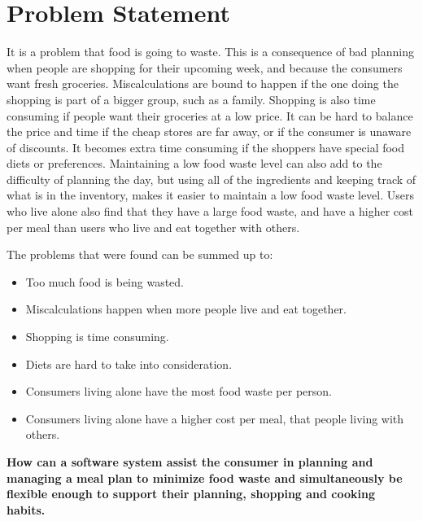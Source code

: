 \chapter{Problem Statement}
It is a problem that food is going to waste.
This is a consequence of bad planning when people are shopping for their upcoming week, and because the consumers want fresh groceries.
Miscalculations are bound to happen if the one doing the shopping is part of a bigger group, such as a family.
Shopping is also time consuming if people want their groceries at a low price.
It can be hard to balance the price and time if the cheap stores are far away, or if the consumer is unaware of discounts.
It becomes extra time consuming if the shoppers have special food diets or preferences.
Maintaining a low food waste level can also add to the difficulty of planning the day, but using all of the ingredients and keeping track of what is in the inventory, makes it easier to maintain a low food waste level.
Users who live alone also find that they have a large food waste, and have a higher cost per meal than users who live and eat together with others.

The problems that were found can be summed up to:

\begin{itemize}
    \item Too much food is being wasted.
    \item Miscalculations happen when more people live and eat together.
    \item Shopping is time consuming.
    \item Diets are hard to take into consideration.
    \item Consumers living alone have the most food waste per person.
    \item Consumers living alone have a higher cost per meal, that people living with others.
\end{itemize}

\textbf{How can a software system assist the consumer in planning and managing a meal plan to minimize food waste and simultaneously be flexible enough to support their planning, shopping and cooking habits.}